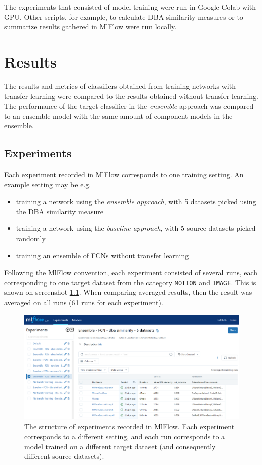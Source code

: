 \documentclass[a4paper,11pt,twoside]{report}
\theoremstyle{definition}
\begin{document}
The experiments that consisted of model training were run in Google Colab with GPU. Other scripts, for example, to calculate DBA similarity measures or to summarize results gathered in MlFlow were run locally.
\chapter{Results}\label{chapter:results}
The results and metrics of classifiers obtained from training networks with transfer learning were compared to the results obtained without transfer learning. The performance of the target classifier in the\textit{ ensemble }approach was compared to an ensemble model with the same amount of component models in the ensemble.

\section{Experiments}
Each experiment recorded in MlFlow corresponds to one training setting. An example setting may be e.g. \begin{itemize}
\item training a network using the \textit{ensemble approach}, with 5 datasets picked using the DBA similarity measure
 \item training a network using the \textit{baseline approach}, with 5 source datasets picked randomly
 \item training an ensemble of FCNs without transfer learning

\end{itemize}
Following the MlFlow convention, each experiment consisted of several runs, each corresponding to one target dataset from the category \texttt{MOTION} and \texttt{IMAGE}. This is shown on screenshot \ref{fig:mlflow_screnshot}. When comparing averaged results, then the result was averaged on all runs (61 runs for each experiment).


\FloatBarrier

\begin{figure}[h!t]
\centering
\includegraphics[width=17cm]{imgs/mlflow_screenshot.png}
\caption{The structure of experiments recorded in MlFlow. Each experiment corresponds to a different setting, and each run corresponds to a model trained on a different target dataset (and consequently different source datasets).}
\label{fig:mlflow_screnshot}
\end{figure}
\FloatBarrier
\end{document}
